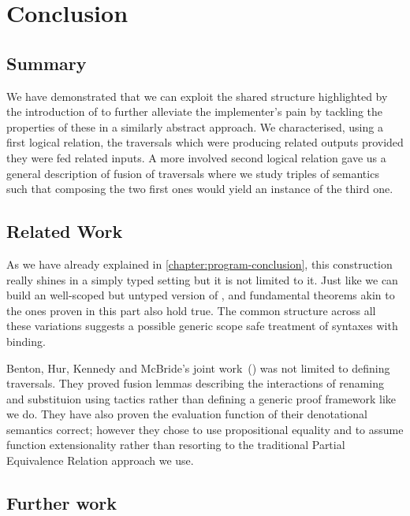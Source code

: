\chapter{Conclusion}

\section{Summary}

We have demonstrated that we can exploit the shared structure highlighted by the introduction
of  to further alleviate the implementer's pain by tackling the properties of
these  in a similarly abstract approach. We characterised, using a first logical
relation, the traversals which were producing related outputs provided they were fed related
inputs. A more involved second logical relation gave us a general description of fusion of
traversals where we study triples of semantics such that composing the two first ones would
yield an instance of the third one.

\section{Related Work}
As we have already explained in \cref{chapter:program-conclusion}, this construction
really shines in a simply typed setting but it is not limited to it. Just like we can
build an well-scoped but untyped version of ,  and 
fundamental theorems akin to the ones proven in this part also hold true. The common
structure across all these variations suggests a possible generic scope safe treatment
of syntaxes with binding.

Benton, Hur, Kennedy and McBride's joint work~(\citeyear{benton2012strongly}) was not
limited to defining traversals. They proved fusion lemmas describing the interactions
of renaming and substituion using tactics rather than defining a generic proof framework
like we do. They have also proven the evaluation function of their denotational semantics
correct; however they chose to use propositional equality and to assume function extensionality
rather than resorting to the traditional Partial Equivalence Relation approach we use.


\section{Further work}

